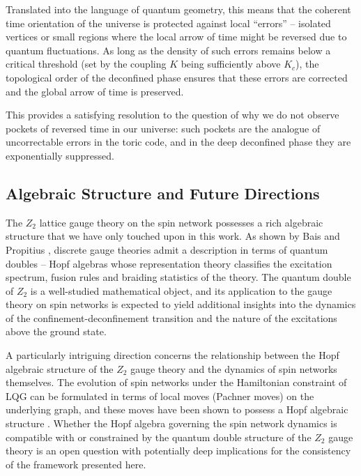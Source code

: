 \documentclass[preprint]{SciPost}
\theoremstyle{plain} %
\begin{document}
Translated into the language of quantum geometry, this means that the coherent time orientation of the universe is protected against local ``errors'' -- isolated vertices or small regions where the local arrow of time might be reversed due to quantum fluctuations. As long as the density of such errors remains below a critical threshold (set by the coupling $ K $ being sufficiently above $ K_c $), the topological order of the deconfined phase ensures that these errors are corrected and the global arrow of time is preserved.

This provides a satisfying resolution to the question of why we do not observe pockets of reversed time in our universe: such pockets are the analogue of uncorrectable errors in the toric code, and in the deep deconfined phase they are exponentially suppressed.

\subsection{Algebraic Structure and Future Directions}

The $ Z_2 $ lattice gauge theory on the spin network possesses a rich algebraic structure that we have only touched upon in this work. As shown by Bais and Propitius \cite{Propitius1996Discrete}, discrete gauge theories admit a description in terms of quantum doubles -- Hopf algebras whose representation theory classifies the excitation spectrum, fusion rules and braiding statistics of the theory. The quantum double of $ Z_2 $ is a well-studied mathematical object, and its application to the gauge theory on spin networks is expected to yield additional insights into the dynamics of the confinement-deconfinement transition and the nature of the excitations above the ground state.

A particularly intriguing direction concerns the relationship between the Hopf algebraic structure of the $ Z_2 $ gauge theory and the dynamics of spin networks themselves. The evolution of spin networks under the Hamiltonian constraint of LQG can be formulated in terms of local moves (Pachner moves) on the underlying graph, and these moves have been shown to possess a Hopf algebraic structure \cite{Markopoulou1997Dual,Markopoulou2000Quantum}. Whether the Hopf algebra governing the spin network dynamics is compatible with or constrained by the quantum double structure of the $ Z_2 $ gauge theory is an open question with potentially deep implications for the consistency of the framework presented here.
\end{document}
